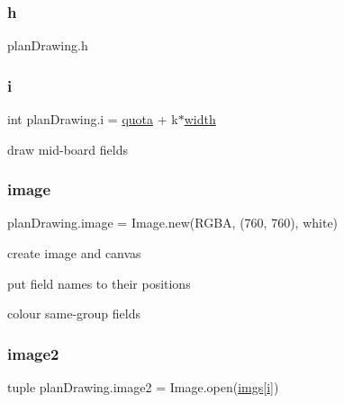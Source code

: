 \mbox{\label{namespaceplan_drawing_ae4861d93282ebc625dbbc2f1676f3baf}} 
\subsubsection{\texorpdfstring{h}{h}}
{\footnotesize\ttfamily plan\+Drawing.\+h}

\mbox{\label{namespaceplan_drawing_a9b507814fb99be9c876ea329f40fc0f1}} 
\subsubsection{\texorpdfstring{i}{i}}
{\footnotesize\ttfamily int plan\+Drawing.\+i = \mbox{\hyperlink{namespaceplan_drawing_a24a9f6fc7a9b6b3d6f1d1b8e0dd33e5d}{quota}} + k$\ast$\mbox{\hyperlink{namespaceplan_drawing_a514306bc74067f7281091ab310589e78}{width}}}



draw mid-\/board fields 

\mbox{\label{namespaceplan_drawing_af4e3df3fcff8b46fd59536de55f1a4c9}} 
\subsubsection{\texorpdfstring{image}{image}}
{\footnotesize\ttfamily plan\+Drawing.\+image = Image.\+new(\textquotesingle{}R\+G\+BA\textquotesingle{}, (760, 760), \textquotesingle{}white\textquotesingle{})}



create image and canvas 

put field names to their positions

colour same-\/group fields \mbox{\label{namespaceplan_drawing_ae0a78429cc8ba7006c65f1f11ec99084}} 
\subsubsection{\texorpdfstring{image2}{image2}}
{\footnotesize\ttfamily tuple plan\+Drawing.\+image2 = Image.\+open(\mbox{\hyperlink{namespaceplan_drawing_a0a2455d5a72f1d606af897f753ad35b6}{imgs}}\mbox{[}\mbox{\hyperlink{namespaceplan_drawing_a9b507814fb99be9c876ea329f40fc0f1}{i}}\mbox{]})}

